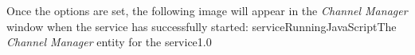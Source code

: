 Once the options are set, the following image will appear in the \emph{Channel Manager}
window when the service has successfully started:
%
{serviceRunningJavaScript}{The \emph{Channel Manager} entity for the \JSIO{} service}{1.0}
\secondaryEnd
\primaryEnd{}
